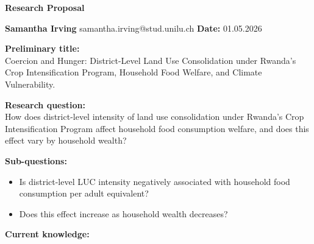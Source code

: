 \documentclass[11pt]{article}
\begin{document}
\begin{center}
    \textbf{\Large Research Proposal}
\end{center}

\vspace{0.4cm}

\noindent \textbf{Samantha Irving} \quad samantha.irving@stud.unilu.ch \hfill \textbf{Date:} 01.05.2026

\vspace{0.4cm}

\noindent \textbf{Preliminary title:} \\
Coercion and Hunger: District-Level Land Use Consolidation under Rwanda's
Crop Intensification Program, Household Food Welfare, and Climate
Vulnerability.

\vspace{0.4cm}

\noindent \textbf{Research question:} \\
How does district-level intensity of land use consolidation under Rwanda's
Crop Intensification Program affect household food consumption welfare, and
does this effect vary by household wealth?

\vspace{0.3cm}
\noindent \textbf{Sub-questions:}
\begin{itemize}[noitemsep, topsep=2pt]
    \item Is district-level LUC intensity negatively associated with household
          food consumption per adult equivalent?
    \item Does this effect increase as household wealth decreases?
\end{itemize}

\vspace{0.4cm}

\noindent \textbf{Current knowledge:} \\
\end{document}
